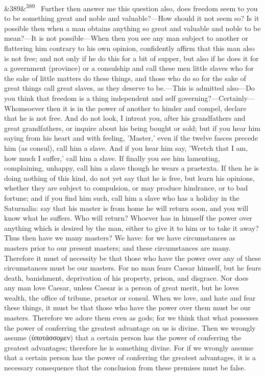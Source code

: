 \documentclass[12pt]{article}
\newcommand{\para}[1][]{\par\noindent\ifx&#1&\else\textsuperscript{\footnotesize #1}~\fi}
\begin{document}
\para[389] Further then answer me this question also, does freedom seem to you to be something great and noble and valuable?—How should it not seem so? Is it possible then when a man obtains anything so great and valuable and noble to be mean?—It is not possible—When then you see any man subject to another or flattering him contrary to his own opinion, confidently affirm that this man also is not free; and not only if he do this for a bit of supper, but also if he does it for a government (province) or a consulship and call these men little slaves who for the sake of little matters do these things, and those who do so for the sake of great things call great slaves, as they deserve to be.—This is admitted also—Do you think that freedom is a thing independent and self governing?—Certainly—Whomsoever then it is in the power of another to hinder and compel, declare that he is not free. And do not look, I intreat you, after his grandfathers and great grandfathers, or inquire about his being bought or sold; but if you hear him saying from his heart and with feeling, 'Master,' even if the twelve fasces precede him (as consul), call him a slave. And if you hear him say, 'Wretch that I am, how much I suffer,' call him a slave. If finally you see him lamenting, complaining, unhappy, call him a slave though he wears a praetexta. If then he is doing nothing of this kind, do not yet say that he is free, but learn his opinions, whether they are subject to compulsion, or may produce hindrance, or to bad fortune; and if you find him such, call him a slave who has a holiday in the Saturnalia: say that his master is from home he will return soon, and you will know what he suffers. Who will return? Whoever has in himself the power over anything which is desired by the man, either to give it to him or to take it away? Thus then have we many masters? We have: for we have circumstances as masters prior to our present masters; and these circumstances are many. Therefore it must of necessity be that those who have the power over any of these circumstances must be our masters. For no man fears Caesar himself, but he fears death, banishment, deprivation of his property, prison, and disgrace. Nor does any man love Caesar, unless Caesar is a person of great merit, but he loves wealth, the office of tribune, praetor or consul. When we love, and hate and fear these things, it must be that those who have the power over them must be our masters. Therefore we adore them even as gods; for we think that what possesses the power of conferring the greatest advantage on us is divine. Then we wrongly assume (ὑποτάσσομεν) that a certain person has the power of conferring the greatest advantages; therefore he is something divine. For if we wrongly assume that a certain person has the power of conferring the greatest advantages, it is a necessary consequence that the conclusion from these premises must be false.
\end{document}
